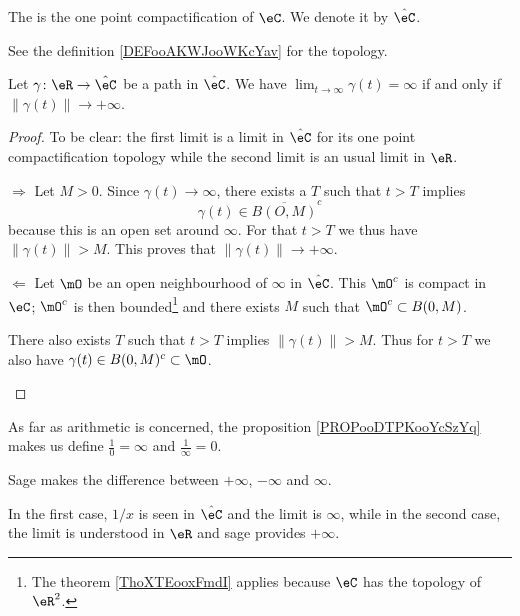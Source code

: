 \begin{definition}      \label{DEFooMAHAooGUYyqU}
    The  is the one point compactification of \( \eC\). We denote it by \( \hat \eC\). 
\end{definition}
See the definition \ref{DEFooAKWJooWKcYav} for the topology.

\begin{proposition}     \label{PROPooDTPKooYcSzYq}
    Let \( \gamma\colon \eR\to \hat \eC\) be a path in \( \hat \eC\). We have \( \lim_{t\to \infty} \gamma(t)=\infty\) if and only if \( \| \gamma(t) \|\to +\infty\).
\end{proposition}

\begin{proof}
    To be clear: the first limit is a limit in \( \hat \eC\) for its one point compactification topology while the second limit is an usual limit in \( \eR\).
    \begin{subproof}
    \item[\( \Rightarrow\)]
        Let \( M>0\). Since \( \gamma(t)\to \infty\), there exists a \( T\) such that \( t>T\) implies 
        \begin{equation}
            \gamma(t)\in\overline{ B(O,M) }^c
        \end{equation}
        because this is an open set around \( \infty\). For that \( t>T\) we thus have \( \| \gamma(t) \|>M\). This proves that \( \| \gamma(t) \|\to +\infty\).
    \item[\( \Leftarrow\)]
        Let \( \mO\) be an open neighbourhood of \( \infty\) in \( \hat \eC\). This \( \mO^c\) is compact in \( \eC\); \( \mO^c\) is then bounded\footnote{The theorem \ref{ThoXTEooxFmdI} applies because \( \eC\) has the topology of \( \eR^2\).} and there exists \( M\) such that \( \mO^c\subset B(0,M)\).

        There also exists \( T\) such that \( t>T\) implies \( \| \gamma(t) \|>M\). Thus for \( t>T\) we also have \( \gamma(t)\in B(0,M)^c\subset \mO\).
    \end{subproof}
\end{proof}

As far as arithmetic is concerned, the proposition \ref{PROPooDTPKooYcSzYq} makes us  define \( \frac{1}{ 0 }=\infty\) and \( \frac{ 1 }{ \infty }=0\). 

\begin{remark}
    
    Sage makes the difference between \( +\infty\), \( -\infty\) and \( \infty\).

    In the first case, \( 1/x\) is seen in \( \hat \eC\) and the limit is \( \infty\), while in the second case, the limit is understood in \( \eR\) and sage provides \( +\infty\).
\end{remark}

